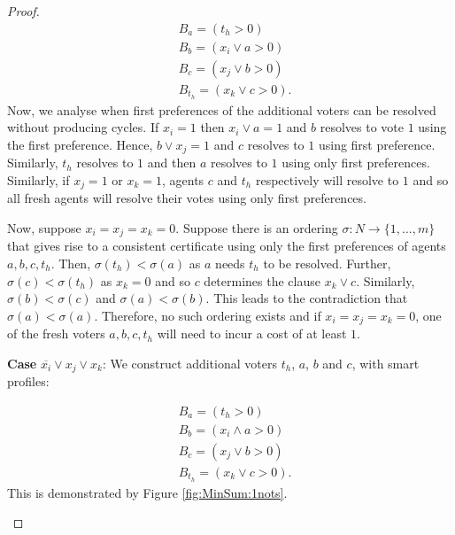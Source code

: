 \documentclass[11pt,a4paper, titlepage]{article}
\theoremstyle{definition}
\begin{document}
\begin{proof}
\begin{align*}
    &B_a = (t_h > 0) \\
    &B_b = (x_i \lor a > 0) \\
    &B_c = (x_j \lor b > 0) \\
    &B_{t_h} = (x_k \lor c > 0).
\end{align*}
Now, we analyse when first preferences of the additional voters can be resolved without producing cycles. If $x_i = 1$ then $x_i \lor a = 1$ and $b$ resolves to vote $1$ using the first preference. 
Hence, $b \lor x_j = 1$ and $c$ resolves to $1$ using first preference. 
Similarly, $t_h$ resolves to $1$ and then $a$ resolves to $1$ using only first preferences. 
Similarly, if $x_j = 1$ or $x_k = 1$, agents $c$ and $t_h$ respectively will resolve to $1$ and so all fresh agents will resolve their votes using only first preferences.

Now, suppose $x_i = x_j = x_k = 0$. Suppose there is an ordering $\sigma \colon N \longrightarrow \{1,\ldots, m\}$ that gives rise to a consistent certificate using only the first preferences of agents $a, b, c, t_h$. Then, $\sigma(t_h) < \sigma(a)$ as $a$ needs $t_h$ to be resolved. Further, $\sigma(c) < \sigma(t_h)$ as $x_k = 0$ and so $c$ determines the clause $x_k \lor c$. Similarly, $\sigma(b) < \sigma(c)$ and $\sigma(a) < \sigma(b)$. This leads to the contradiction that $\sigma(a) < \sigma(a)$. Therefore, no such ordering exists and if $x_i = x_j = x_k = 0$, one of the fresh voters $a, b, c, t_h$ will need to incur a cost of at least $1$.

\textbf{Case} $\overline{x_i} \lor x_j \lor x_k$: We construct additional voters $t_h$, $a$, $b$ and $c$, with smart profiles:

\begin{align*}
    &B_a = (t_h > 0) \\
    &B_b = (x_i \land a > 0) \\
    &B_c = (x_j \lor b > 0) \\
    &B_{t_h} = (x_k \lor c > 0).
\end{align*}
This is demonstrated by Figure \ref{fig:MinSum:1nots}.

    \begin{figure}
        \centering
\end{figure}
\end{proof}
\end{document}
